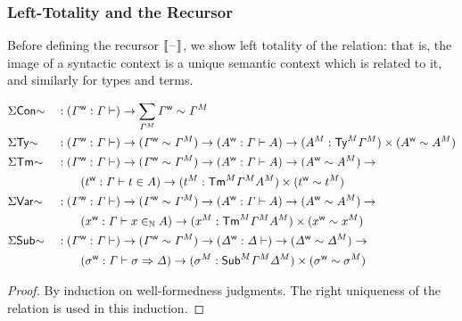 \subsubsection{Left-Totality and the Recursor}

Before defining the recursor $\ll\blank\rr$, we show left totality of
the relation: that is, the image of a syntactic context is a unique
semantic context which is related to it, and similarly for types and
terms.
\begin{lemma}
\begin{alignat*}{5}
     & \Sigma\Con{\sim} && :
    (\wf{\GG} : \GG \vdash ) \ra
    \sum_{\model{\GG}} \wf{\GG} \sim \model{\GG}
    \\
     & \Sigma\Ty{\sim} && :
    (\wf{\GG} : \GG \vdash ) \ra
    (\wf{\GG}\sim \model\GG) \ra
    (\wf{A} : \GG \vdash A ) \ra
    ({\model{A}:\model{\Ty}\model\GG})\times ( \wf{A} \sim \model{A})
    \\
     & \Sigma\Tm{\sim} && :
    (\wf{\GG} : \GG \vdash ) \ra
    (\wf{\GG}\sim \model\GG) \ra
    (\wf{A} : \GG \vdash A ) \ra
    ( \wf{A} \sim \model{A}) \ra
    \\ & && \qquad
    (\wf{t} : \GG \vdash t \in A ) \ra
    ({\model{t}:\model{\Tm}\model\GG}\model{A})\times ( \wf{t} \sim \model{t})
    \\
     & \Sigma\Var{\sim} && :
    (\wf{\GG} : \GG \vdash ) \ra
    (\wf{\GG}\sim \model\GG) \ra
    (\wf{A} : \GG \vdash A ) \ra
    ( \wf{A} \sim \model{A}) \ra
    \\ & && \qquad
    (\wf{x} : \GG \vdash x \invar A ) \ra
    ({\model{x}:\model{\Tm}\model\GG}\model{A})\times ( \wf{x} \sim \model{x})
    \\
     & \Sigma\Sub{\sim} && :
    (\wf{\GG} : \GG \vdash ) \ra
    (\wf{\GG}\sim \model\GG) \ra
    (\wf{\GD} : \GD \vdash  ) \ra
    ( \wf{\GD} \sim \model{\GD}) \ra
    \\ & && \qquad
    (\wf{\sigma} : \GG \vdash \sigma \Rightarrow \GD ) \ra
    ({\model{\sigma}:\model{\Sub}\model\GG}\model{\GD})\times ( \wf{\sigma} \sim \model{\sigma})
  \end{alignat*}
\end{lemma}
\begin{proof}
  By induction on well-formedness judgments. The right uniqueness of
  the relation is used in this induction.
\end{proof}


